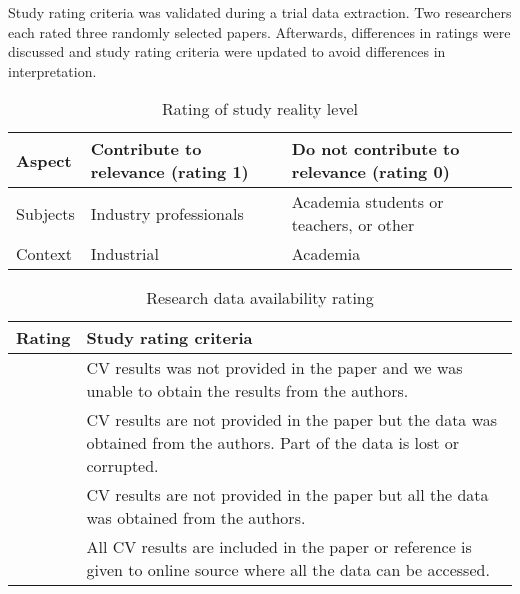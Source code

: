 
Study rating criteria was validated during a trial data extraction. Two researchers each rated three randomly selected papers. Afterwards, differences in ratings were discussed and study rating criteria were updated to avoid differences in interpretation.

\begin{table}
	\scriptsize
\caption{\label{tab:Study-Setting-Rating}Rating of study reality level}
\begin{tabular}{|>{\centering}p{}|>{\centering}p{}|>{\centering}p{}|}
\hline 
Aspect & Contribute to relevance (rating 1) & Do not contribute to relevance (rating 0)\tabularnewline
\hline\hline
Subjects & Industry professionals & Academia students or teachers, or other\tabularnewline
\hline 
Context & Industrial & Academia\tabularnewline
\hline 
\end{tabular}%
\end{table}

\begin{table}
	\scriptsize
\caption{\label{tab:Research-Data-Availability}Research data availability rating}
\begin{tabular}{|>{\centering}p{}|>{\raggedright}p{}|}
\hline 
Rating & \centering{}Study rating criteria\tabularnewline
\hline \hline
0 & CV results was not provided in the paper and we was unable to obtain
the results from the authors.\tabularnewline
\hline 
1 & CV results are not provided in the paper but the data was obtained
from the authors. Part of the data is lost or corrupted.\tabularnewline
\hline 
2 & CV results are not provided in the paper but all the data was obtained
from the authors.\tabularnewline
\hline 
3 & All CV results are included in the paper or reference is given to
online source where all the data can be accessed.\tabularnewline
\hline
\end{tabular}%
\end{table}

